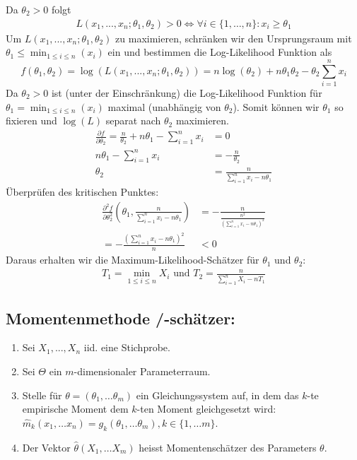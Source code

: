 Da $\theta_2 > 0$ folgt 
\begin{align*}
    L(x_1, ..., x_n; \theta_1, \theta_2) > 0 \iff \forall i \in \{1, \dots, n\}: x_i \geq \theta_1
\end{align*}
Um $L(x_1, ..., x_n; \theta_1, \theta_2)$ zu maximieren, schränken wir den Ursprungsraum mit $\theta_1 \leq \min_{1 \leq i \leq n}(x_i)$ ein 
und bestimmen die Log-Likelihood Funktion als
$$f(\theta_1, \theta_2) = \log\left(L(x_1, ..., x_n; \theta_1, \theta_2)\right) = n \log(\theta_2) + n \theta_1\theta_2 - \theta_2 \sum_{i = 1}^n x_i$$
Da $\theta_2 > 0$ ist (unter der Einschränkung) die Log-Likelihood Funktion für $\theta_1 = \min_{1 \leq i \leq n}(x_i)$ maximal (unabhängig von $\theta_2$).
Somit können wir $\theta_1$ so fixieren und $\log(L)$ separat nach $\theta_2$ maximieren. 
\begin{align*}
    \frac{\partial f}{\partial \theta_2} = \frac{n}{\theta_2} + n\theta_1 - \sum_{i = 1}^n x_i&= 0\\
    n\theta_1 - \sum_{i = 1}^n x_i&= -\frac{n}{\theta_2}\\
    \theta_2 &= \frac{n}{\sum_{i = 1}^n x_i - n \theta_1}
\end{align*}
Überprüfen des kritischen Punktes:
\begin{align*}
     \frac{\partial^2 f}{\partial \theta_2^2}\left(\theta_1, \frac{n}{\sum_{i = 1}^n x_i - n\theta_1}\right) &= -\frac{n}{\frac{n^2}{\left(\sum_{i = 1}^n x_i - n\theta_1\right)^2}}\\
     = -\frac{\left(\sum_{i = 1}^n x_i - n \theta_1\right)^2}{n} &< 0
\end{align*}
Daraus erhalten wir die Maximum-Likelihood-Schätzer für $\theta_1$ und $\theta_2$:
\begin{align*}
    T_1 = \min_{1\leq i \leq n}X_i \text{ und } T_2 = \frac{n}{\sum_{i=1}^n X_i - nT_1}
\end{align*}

\subsection{Momentenmethode /-schätzer:} 
\begin{enumerate}
	\item Sei $X_1, ..., X_n$ iid. eine Stichprobe. 
	\item Sei $\Theta$ ein $m$-dimensionaler Parameterraum. 
	\item Stelle für $\theta = (\theta_1,\dots \theta_m)$ ein Gleichungssystem auf, in dem das $k$-te empirische Moment dem $k$-ten Moment gleichgesetzt wird: $\hat m_k(x_1,\dots x_n) = g_k(\theta_1,\dots \theta_m), k \in \{1,\dots m\}.$ 
	\item Der Vektor $\hat \theta(X_1,\dots X_m)$ heisst Momentenschätzer des Parameters $\theta.$ 
\end{enumerate}
